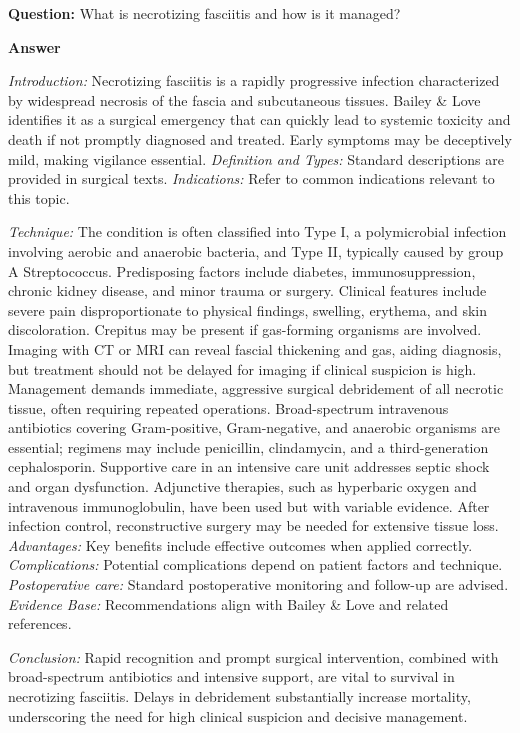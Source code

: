 \documentclass{article}
\begin{document}
\textbf{Question:} What is necrotizing fasciitis and how is it managed?

\textbf{Answer}

\emph{Introduction:} Necrotizing fasciitis is a rapidly progressive infection characterized by widespread necrosis of the fascia and subcutaneous tissues. Bailey & Love identifies it as a surgical emergency that can quickly lead to systemic toxicity and death if not promptly diagnosed and treated. Early symptoms may be deceptively mild, making vigilance essential.
\emph{Definition and Types:} Standard descriptions are provided in surgical texts.
\emph{Indications:} Refer to common indications relevant to this topic.

\emph{Technique:} The condition is often classified into Type I, a polymicrobial infection involving aerobic and anaerobic bacteria, and Type II, typically caused by group A Streptococcus. Predisposing factors include diabetes, immunosuppression, chronic kidney disease, and minor trauma or surgery. Clinical features include severe pain disproportionate to physical findings, swelling, erythema, and skin discoloration. Crepitus may be present if gas-forming organisms are involved. Imaging with CT or MRI can reveal fascial thickening and gas, aiding diagnosis, but treatment should not be delayed for imaging if clinical suspicion is high. Management demands immediate, aggressive surgical debridement of all necrotic tissue, often requiring repeated operations. Broad-spectrum intravenous antibiotics covering Gram-positive, Gram-negative, and anaerobic organisms are essential; regimens may include penicillin, clindamycin, and a third-generation cephalosporin. Supportive care in an intensive care unit addresses septic shock and organ dysfunction. Adjunctive therapies, such as hyperbaric oxygen and intravenous immunoglobulin, have been used but with variable evidence. After infection control, reconstructive surgery may be needed for extensive tissue loss.
\emph{Advantages:} Key benefits include effective outcomes when applied correctly.
\emph{Complications:} Potential complications depend on patient factors and technique.
\emph{Postoperative care:} Standard postoperative monitoring and follow-up are advised.
\emph{Evidence Base:} Recommendations align with Bailey & Love and related references.

\emph{Conclusion:} Rapid recognition and prompt surgical intervention, combined with broad-spectrum antibiotics and intensive support, are vital to survival in necrotizing fasciitis. Delays in debridement substantially increase mortality, underscoring the need for high clinical suspicion and decisive management.
\end{document}
